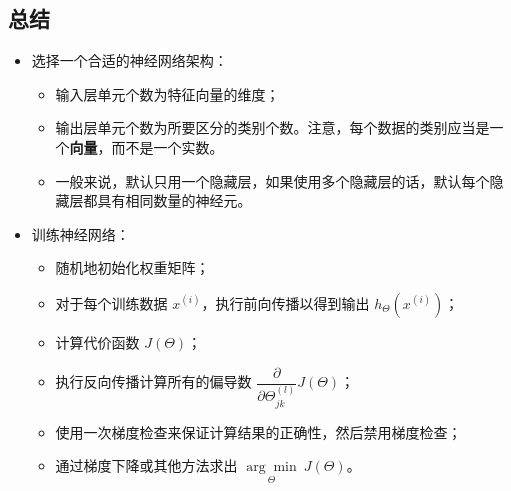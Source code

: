 \subsection{总结}
\begin{itemize}
    \item 选择一个合适的神经网络架构：
    \begin{itemize}
        \item 输入层单元个数为特征向量的维度；
        \item 输出层单元个数为所要区分的类别个数。注意，每个数据的类别应当是一个\textbf{向量}，而不是一个实数。
        \item 一般来说，默认只用一个隐藏层，如果使用多个隐藏层的话，默认每个隐藏层都具有相同数量的神经元。
    \end{itemize}
    \item 训练神经网络：
    \begin{itemize}
        \item 随机地初始化权重矩阵；
        \item 对于每个训练数据 $x^{(i)}$，执行前向传播以得到输出 $h_\Theta(x^{(i)})$；
        \item 计算代价函数 $J(\Theta)$；
        \item 执行反向传播计算所有的偏导数 $\dfrac{\partial}{\partial \Theta_{jk}^{(l)}}J(\Theta)$；
        \item 使用一次梯度检查来保证计算结果的正确性，然后禁用梯度检查；
        \item 通过梯度下降或其他方法求出 $\underset{\Theta}{\arg\min}\ J(\Theta)$。
    \end{itemize}
\end{itemize}